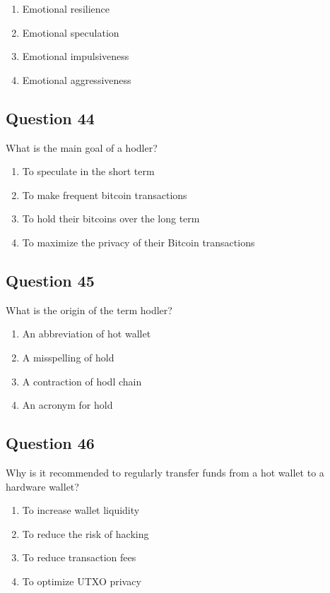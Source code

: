 \documentclass[12pt,a4paper]{article}
\begin{document}
\begin{enumerate}[label=\Alph*., leftmargin=*]
\item Emotional resilience
\item Emotional speculation
\item Emotional impulsiveness
\item Emotional aggressiveness
\end{enumerate}

\bigskip


\subsection*{Question 44}
What is the main goal of a hodler?

\begin{enumerate}[label=\Alph*., leftmargin=*]
\item To speculate in the short term
\item To make frequent bitcoin transactions
\item To hold their bitcoins over the long term
\item To maximize the privacy of their Bitcoin transactions
\end{enumerate}

\bigskip


\subsection*{Question 45}
What is the origin of the term hodler?

\begin{enumerate}[label=\Alph*., leftmargin=*]
\item An abbreviation of hot wallet
\item A misspelling of hold
\item A contraction of hodl chain
\item An acronym for hold
\end{enumerate}

\bigskip


\subsection*{Question 46}
Why is it recommended to regularly transfer funds from a hot wallet to a hardware wallet?

\begin{enumerate}[label=\Alph*., leftmargin=*]
\item To increase wallet liquidity
\item To reduce the risk of hacking
\item To reduce transaction fees
\item To optimize UTXO privacy
\end{enumerate}
\end{document}
